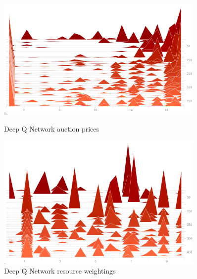 \begin{figure}
    \centering
    \begin{minipage}{0.45\textwidth}
        \centering
        \includegraphics[width=0.9\textwidth]{figures/algo_training_fig/dqn_auction_prices.png}
        \caption{Deep Q Network auction prices}
        \label{fig:dqn-auction-prices}
    \end{minipage}\hfill
    \begin{minipage}{0.45\textwidth}
        \centering
        \includegraphics[width=0.9\textwidth]{figures/algo_training_fig/dqn_weightings.png}
        \caption{Deep Q Network resource weightings}
        \label{fig:dqn-resource-weightings}
    \end{minipage}
\end{figure}

